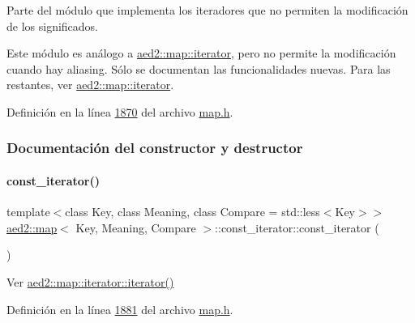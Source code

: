 Parte del módulo que implementa los iteradores que no permiten la modificación de los significados. 

Este módulo es análogo a \hyperlink{classaed2_1_1map_1_1iterator}{aed2\+::map\+::iterator}, pero no permite la modificación cuando hay aliasing. Sólo se documentan las funcionalidades nuevas. Para las restantes, ver \hyperlink{classaed2_1_1map_1_1iterator}{aed2\+::map\+::iterator}. 

Definición en la línea \hyperlink{map_8h_source_l01870}{1870} del archivo \hyperlink{map_8h_source}{map.\+h}.



\subsubsection{Documentación del constructor y destructor}
\mbox{\label{classaed2_1_1map_1_1const__iterator_a8add3e4cabbdaf313b0e085064491555_a8add3e4cabbdaf313b0e085064491555}} 
\paragraph{\texorpdfstring{const\+\_\+iterator()}{const\_iterator()}\hspace{0.1cm}{\footnotesize\ttfamily [1/3]}}
{\footnotesize\ttfamily template$<$class Key, class Meaning, class Compare = std\+::less$<$\+Key$>$$>$ \\
\hyperlink{classaed2_1_1map}{aed2\+::map}$<$ Key, Meaning, Compare $>$\+::const\+\_\+iterator\+::const\+\_\+iterator (\begin{DoxyParamCaption}{ }\end{DoxyParamCaption})\hspace{0.3cm}{\ttfamily [inline]}}



Ver \hyperlink{classaed2_1_1map_1_1iterator_acdd790eb54216601a2e0591776004dba_acdd790eb54216601a2e0591776004dba}{aed2\+::map\+::iterator\+::iterator()} 



Definición en la línea \hyperlink{map_8h_source_l01881}{1881} del archivo \hyperlink{map_8h_source}{map.\+h}.

